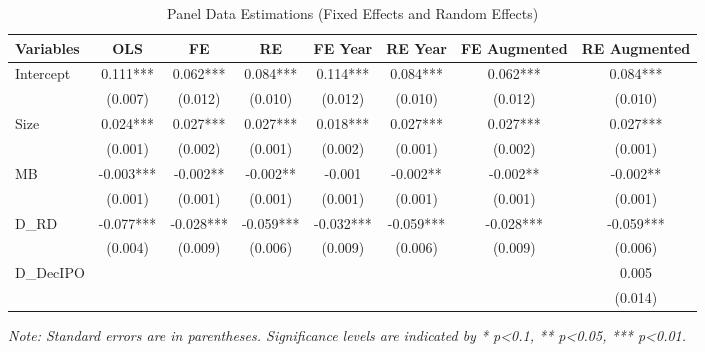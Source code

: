 \documentclass{article}
\begin{document}
\begin{table}[h!]
    \centering
    \caption{Panel Data Estimations (Fixed Effects and Random Effects)}
    \begin{tabular}{lccccccc}
        \toprule
        Variables & OLS       & FE        & RE        & FE Year   & RE Year   & FE Augmented & RE Augmented \\
        \midrule
        Intercept & 0.111***  & 0.062***  & 0.084***  & 0.114***  & 0.084***  & 0.062***     & 0.084***     \\
                  & (0.007)   & (0.012)   & (0.010)   & (0.012)   & (0.010)   & (0.012)      & (0.010)      \\
        Size      & 0.024***  & 0.027***  & 0.027***  & 0.018***  & 0.027***  & 0.027***     & 0.027***     \\
                  & (0.001)   & (0.002)   & (0.001)   & (0.002)   & (0.001)   & (0.002)      & (0.001)      \\
        MB        & -0.003*** & -0.002**  & -0.002**  & -0.001    & -0.002**  & -0.002**     & -0.002**     \\
                  & (0.001)   & (0.001)   & (0.001)   & (0.001)   & (0.001)   & (0.001)      & (0.001)      \\
        D\_RD     & -0.077*** & -0.028*** & -0.059*** & -0.032*** & -0.059*** & -0.028***    & -0.059***    \\
                  & (0.004)   & (0.009)   & (0.006)   & (0.009)   & (0.006)   & (0.009)      & (0.006)      \\
        D\_DecIPO &           &           &           &           &           &              & 0.005        \\
                  &           &           &           &           &           &              & (0.014)      \\
        \bottomrule
    \end{tabular}
    \newline
    \textit{Note: Standard errors are in parentheses. Significance levels are indicated by * p\textless 0.1, ** p\textless 0.05, *** p\textless 0.01.}
\end{table}
\end{document}
